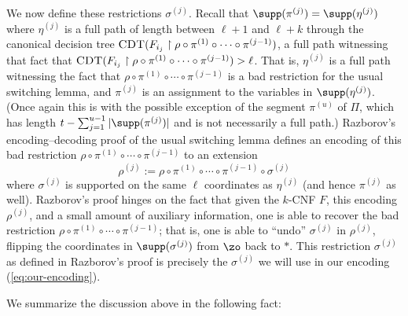\documentclass{toc}
\theoremstyle{plain}
\newcommand{\uhr}{\upharpoonright}
\newcommand{\CDT}{\textsc{CDT}}
\begin{document}
We now define these restrictions $\sigma^{(j)}$. Recall that $\supp(\pi^{(j)}) = \supp(\eta^{(j)})$ where $\eta^{(j)}$ is a full path of length between $\ell+1$ and $\ell+k$ through the canonical decision tree $\CDT(F_{i_j} \uhr \rho \circ \pi^{(1)}\circ\cdots\circ \pi^{(j-1)})$, a full path witnessing that fact that $\CDT(F_{i_j} \uhr \rho \circ \pi^{(1)}\circ\cdots\circ \pi^{(j-1)}) > \ell$. That is, $\eta^{(j)}$ is a full path witnessing the fact that $\rho \circ \pi^{(1)}\circ\cdots\circ \pi^{(j-1)}$ is a bad restriction for the usual switching lemma, and $\pi^{(j)}$ is an assignment to the variables in $\supp(\eta^{(j)})$. (Once again this is with the possible exception of the segment $\pi^{(u)}$ of $\Pi$, which has length $t - \sum_{j=1}^{u-1} |\supp(\pi^{(j)})|$ and is not necessarily a full path.) Razborov's encoding--decoding proof of the usual switching lemma defines an encoding of this bad restriction $\rho \circ \pi^{(1)}\circ\cdots\circ \pi^{(j-1)}$ to an extension 
\[ \rho^{(j)} := \rho\circ \pi^{(1)} \circ \cdots \circ \pi^{(j-1)} \circ \sigma^{(j)} \] 
where $\sigma^{(j)}$ is supported on the same $\ell$ coordinates as $\eta^{(j)}$ (and hence $\pi^{(j)}$ as well). Razborov's proof hinges on the fact that given the $k$-CNF $F$, this encoding $\rho^{(j)}$, and a small amount of auxiliary information, one is able  to recover the bad restriction $\rho\circ \pi^{(1)}\circ\cdots\circ \pi^{(j-1)}$; that is, one is able to ``undo'' $\sigma^{(j)}$ in $\rho^{(j)}$, flipping the coordinates in $\supp(\sigma^{(j)})$ from $\zo$ back to $\ast$.  This restriction $\sigma^{(j)}$ as defined in Razborov's proof is precisely the $\sigma^{(j)}$ we will use in our encoding (\ref{eq:our-encoding}). 



We summarize the discussion above in the following fact: 
\end{document}
